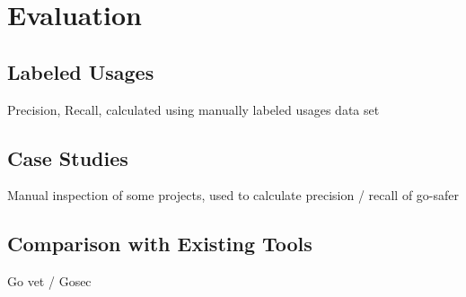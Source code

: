 \section{Evaluation}\label{sec:go-safer:evaluation}



\subsection{Labeled Usages}\label{subsec:go-safer:evaluation:labeled-usages}

Precision, Recall, calculated using manually labeled usages data set





\subsection{Case Studies}\label{subsec:go-safer:evaluation:case-studies}

Manual inspection of some projects, used to calculate precision / recall of go-safer





\subsection{Comparison with Existing Tools}\label{subsec:go-safer:evaluation:linters-comparison}

Go vet / Gosec
